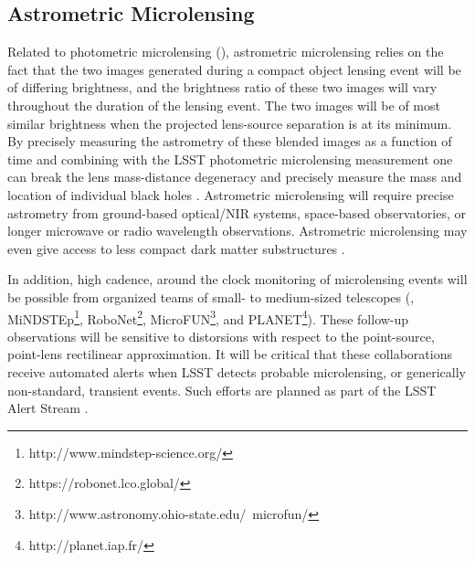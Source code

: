 \subsection{Astrometric Microlensing }
\label{sec:astrometric_microlens}

Related to photometric microlensing (), astrometric microlensing relies on the fact that the two images generated during a compact object lensing event will be of differing brightness, and the brightness ratio of these two images will vary throughout the duration of the lensing event.
The two images will be of most similar brightness when the projected lens-source separation is at its minimum.
By precisely measuring the astrometry of these blended images as a function of time and combining with the LSST photometric microlensing measurement one can break the lens mass-distance degeneracy and precisely measure the mass and location of individual black holes \citep{2015ApJ...814L..11Y}.
Astrometric microlensing will require precise astrometry from ground-based optical/NIR systems, space-based observatories, or longer microwave or radio wavelength observations.
Astrometric microlensing may even give access to less compact dark matter substructures \citep{1804.01991}.

In addition, high cadence, around the clock monitoring of microlensing events will be possible from organized teams of small- to medium-sized telescopes (\eg, MiNDSTEp\footnote{http://www.mindstep-science.org/}, RoboNet\footnote{https://robonet.lco.global/}, MicroFUN\footnote{http://www.astronomy.ohio-state.edu/~microfun/}, and PLANET\footnote{http://planet.iap.fr/}). 
These follow-up observations will be sensitive to distorsions with respect to the point-source, point-lens rectilinear approximation.
It will be critical that these collaborations receive automated alerts when LSST detects probable microlensing, or generically non-standard, transient events. 
Such efforts are planned as part of the LSST Alert Stream \citep{0805.2366}.


